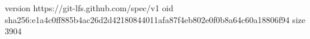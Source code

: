 version https://git-lfs.github.com/spec/v1
oid sha256:e1a4c0ff885b4ac26d2d42180844011afa87f4eb802e0f0b8a64c60a18806f94
size 3904
